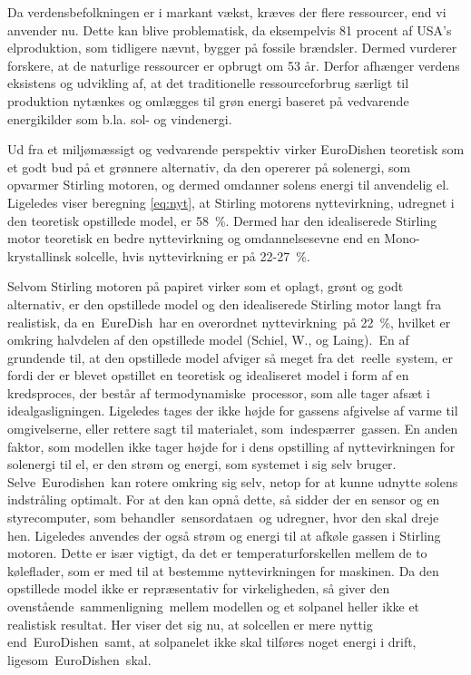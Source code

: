 \documentclass[SRC.tex]{subfiles}
\begin{document}
	Da verdensbefolkningen er i markant vækst, kræves der flere ressourcer, end vi anvender nu. Dette kan blive problematisk, da eksempelvis 81 procent af USA’s elproduktion, som tidligere nævnt, bygger på fossile brændsler. Dermed vurderer forskere, at de naturlige ressourcer er opbrugt om 53 år. Derfor afhænger verdens eksistens og udvikling af, at det traditionelle ressourceforbrug særligt til produktion nytænkes og omlægges til grøn energi baseret på vedvarende energikilder som b.la. sol- og vindenergi. 
	
	Ud fra et miljømæssigt og vedvarende perspektiv virker EuroDishen teoretisk som et godt bud på et grønnere alternativ, da den opererer på solenergi, som opvarmer Stirling motoren, og dermed omdanner solens energi til anvendelig el. Ligeledes viser beregning \eqref{eq:nyt}, at Stirling motorens nyttevirkning, udregnet i den teoretisk opstillede model, er \SI{58}{\percent}. Dermed har den idealiserede Stirling motor teoretisk en bedre nyttevirkning og omdannelsesevne end en Mono-krystallinsk solcelle, hvis nyttevirkning er på 22-\SI{27}{\percent}.  
	
	Selvom Stirling motoren på papiret virker som et oplagt, grønt og godt alternativ, er den opstillede model og den idealiserede Stirling motor langt fra realistisk, da en EureDish har en overordnet nyttevirkning på \SI{22}{\percent}, hvilket er omkring halvdelen af den opstillede model (Schiel, W., og Laing). En af grundende til, at den opstillede model afviger så meget fra det reelle system, er fordi der er blevet opstillet en teoretisk og idealiseret model i form af en kredsproces, der består af termodynamiske processor, som alle tager afsæt i idealgasligningen. Ligeledes tages der ikke højde for gassens afgivelse af varme til omgivelserne, eller rettere sagt til materialet, som indespærrer gassen. En anden faktor, som modellen ikke tager højde for i dens opstilling af nyttevirkningen for solenergi til el, er den strøm og energi, som systemet i sig selv bruger. Selve Eurodishen kan rotere omkring sig selv, netop for at kunne udnytte solens indstråling optimalt. For at den kan opnå dette, så sidder der en sensor og en styrecomputer, som behandler sensordataen og udregner, hvor den skal dreje hen. Ligeledes anvendes der også strøm og energi til at afkøle gassen i Stirling motoren. Dette er især vigtigt, da det er temperaturforskellen mellem de to køleflader, som er med til at bestemme nyttevirkningen for maskinen. Da den opstillede model ikke er repræsentativ for virkeligheden, så giver den ovenstående sammenligning mellem modellen og et solpanel heller ikke et realistisk resultat. Her viser det sig nu, at solcellen er mere nyttig end EuroDishen samt, at solpanelet ikke skal tilføres noget energi i drift, ligesom EuroDishen skal.  
	
\end{document}
